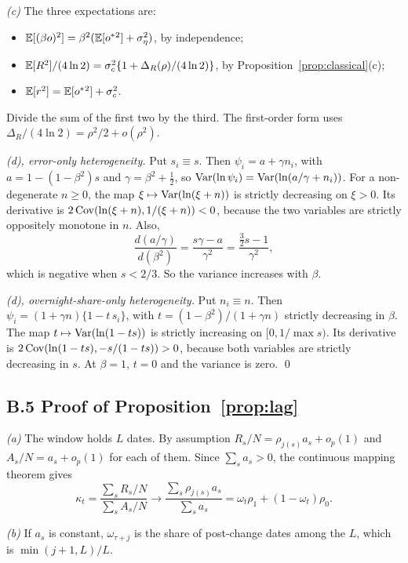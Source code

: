 \emph{(c)} The three expectations are:
\begin{itemize}
  \item $\mathbb{E}[(\beta o)^2]=\beta^2(\mathbb{E}[{o^{*}}{}^2]+\sigma_\eta^2)$, by independence;
  \item $\mathbb{E}[R^2]/(4\ln2)=\sigma_c^2\{1+\Delta_R(\rho)/(4\ln2)\}$, by Proposition~\ref{prop:classical}(c);
  \item $\mathbb{E}[r^2]=\mathbb{E}[{o^{*}}{}^2]+\sigma_c^2$.
\end{itemize}
Divide the sum of the first two by the third. The first-order form uses
$\Delta_R/(4\ln2)=\rho^2/2+o(\rho^2)$.

\emph{(d), error-only heterogeneity.} Put $s_i\equiv s$. Then $\psi_i=a+\gamma n_i$, with
$a=1-(1-\beta^2)s$ and $\gamma=\beta^2+\tfrac12$, so
$\operatorname{Var}(\ln\psi_i)=\operatorname{Var}(\ln(a/\gamma+n_i))$. For a non-degenerate $n\ge0$, the map
$\xi\mapsto\operatorname{Var}(\ln(\xi+n))$ is strictly decreasing on $\xi>0$. Its derivative is
$2\operatorname{Cov}(\ln(\xi+n),1/(\xi+n))<0$, because the two variables are strictly oppositely monotone in
$n$. Also,
\[
  \frac{d(a/\gamma)}{d(\beta^2)}=\frac{s\gamma-a}{\gamma^2}=\frac{\tfrac32s-1}{\gamma^2},
\]
which is negative when $s<2/3$. So the variance increases with $\beta$.

\emph{(d), overnight-share-only heterogeneity.} Put $n_i\equiv n$. Then
$\psi_i=(1+\gamma n)\{1-t\,s_i\}$, with $t=(1-\beta^2)/(1+\gamma n)$ strictly decreasing in
$\beta$. The map $t\mapsto\operatorname{Var}(\ln(1-ts))$ is strictly increasing on $[0,1/\max s)$. Its
derivative is $2\operatorname{Cov}(\ln(1-ts),-s/(1-ts))>0$, because both variables are strictly decreasing in
$s$. At $\beta=1$, $t=0$ and the variance is zero. \qed

\subsection*{B.5 Proof of Proposition~\ref{prop:lag}}

\emph{(a)} The window holds $L$ dates. By assumption $R_s/N=\rho_{j(s)}a_s+o_p(1)$ and
$A_s/N=a_s+o_p(1)$ for each of them. Since $\sum_sa_s>0$, the continuous mapping theorem gives
\[
  \kappa_t=\frac{\sum_sR_s/N}{\sum_sA_s/N}\to\frac{\sum_s\rho_{j(s)}a_s}{\sum_sa_s}=\omega_t\rho_1+(1-\omega_t)\rho_0.
\]

\emph{(b)} If $a_s$ is constant, $\omega_{\tau+j}$ is the share of post-change dates among the
$L$, which is $\min(j+1,L)/L$.

